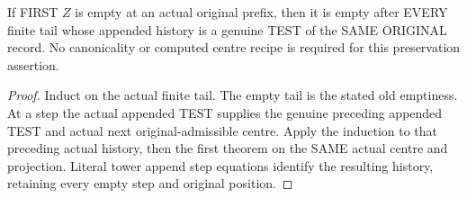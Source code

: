 \begin{theorem}
\label{hir:sharp-original-curve-first-defect-empty-preserved-tail}
\leanok
If FIRST $Z$ is empty at an actual original prefix, then it is empty
after EVERY finite tail whose appended history is a genuine TEST of the
SAME ORIGINAL record. No canonicality or computed centre recipe is
required for this preservation assertion.
\end{theorem}
\begin{proof}
Induct on the actual finite tail. The empty tail is the stated old
emptiness. At a step the actual appended TEST supplies the genuine
preceding appended TEST and actual next original-admissible centre.
Apply the induction to that preceding actual history, then the first
theorem on the SAME actual centre and projection. Literal tower append
step equations identify the resulting history, retaining every empty
step and original position.
\end{proof}

